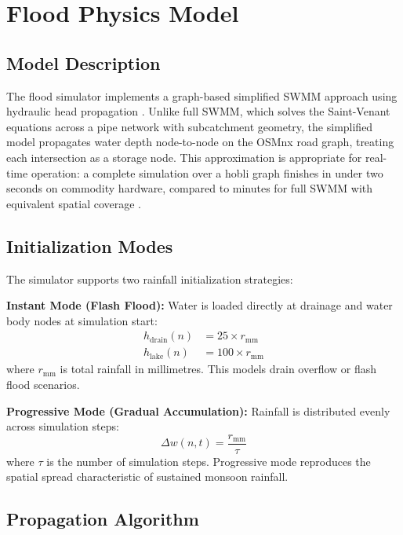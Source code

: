 \documentclass[journal]{IEEEtran}
\begin{document}
\section{Flood Physics Model}
\label{sec:flood}

\subsection{Model Description}

The flood simulator implements a graph-based simplified SWMM approach using hydraulic head
propagation \cite{rossman2010}. Unlike full SWMM, which solves the Saint-Venant equations
across a pipe network with subcatchment geometry, the simplified model propagates water
depth node-to-node on the OSMnx road graph, treating each intersection as a storage node.
This approximation is appropriate for real-time operation: a complete simulation over a
hobli graph finishes in under two seconds on commodity hardware, compared to minutes for
full SWMM with equivalent spatial coverage \cite{mujumdar2021bengaluru}.

\subsection{Initialization Modes}

The simulator supports two rainfall initialization strategies:

\textbf{Instant Mode (Flash Flood):} Water is loaded directly at drainage and water body
nodes at simulation start:
\begin{align}
  h_{\text{drain}}(n) &= 25 \times r_{\text{mm}} \label{eq:init_drain} \\
  h_{\text{lake}}(n)  &= 100 \times r_{\text{mm}} \label{eq:init_lake}
\end{align}
where $r_{\text{mm}}$ is total rainfall in millimetres. This models drain overflow or
flash flood scenarios.

\textbf{Progressive Mode (Gradual Accumulation):} Rainfall is distributed evenly across
simulation steps:
\begin{equation}
  \Delta w(n, t) = \frac{r_{\text{mm}}}{\tau}
  \label{eq:progressive}
\end{equation}
where $\tau$ is the number of simulation steps. Progressive mode reproduces the
spatial spread characteristic of sustained monsoon rainfall.

\subsection{Propagation Algorithm}
\end{document}
